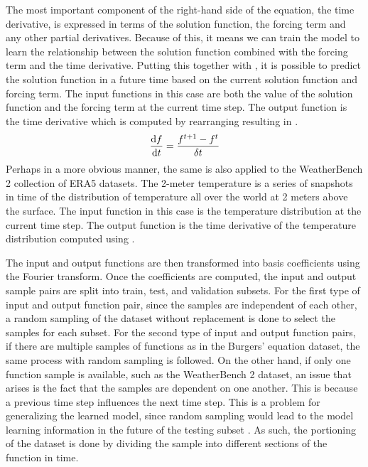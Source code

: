 The most important component of the right-hand side of the equation, the time derivative, is expressed in terms of the solution function, the forcing term and any other partial derivatives. Because of this, it means we can train the model to learn the relationship between the solution function combined with the forcing term and the time derivative. Putting this together with , it is possible to predict the solution function in a future time based on the current solution function and forcing term. The input functions in this case are both the value of the solution function and the forcing term at the current time step. The output function is the time derivative which is computed by rearranging  resulting in .
\begin{equation}
  \dv{f}{t} = \frac{f^{t+1} - f^{t}}{\delta t} \label{eq:time_derivative_time_step_function}
\end{equation}
Perhaps in a more obvious manner, the same is also applied to the WeatherBench 2 collection of ERA5 datasets. The 2-meter temperature is a series of snapshots in time of the distribution of temperature all over the world at 2 meters above the surface. The input function in this case is the temperature distribution at the current time step. The output function is the time derivative of the temperature distribution computed using .

The input and output functions are then transformed into basis coefficients using the Fourier transform. %
Once the coefficients are computed, the input and output sample pairs are split into train, test, and validation subsets. For the first type of input and output function pair, since the samples are independent of each other, a random sampling of the dataset without replacement is done to select the samples for each subset. For the second type of input and output function pairs, if there are multiple samples of functions as in the Burgers' equation dataset, the same process with random sampling is followed. On the other hand, if only one function sample is available, such as the WeatherBench 2 dataset, an issue that arises is the fact that the samples are dependent on one another. This is because a previous time step influences the next time step. This is a problem for generalizing the learned model, since random sampling would lead to the model learning information in the future of the testing subset \autocite{kapoorLeakageReproducibilityCrisis2023,kaufmanLeakageDataMining2012}. As such, the portioning of the dataset is done by dividing the sample into different sections of the function in time.

